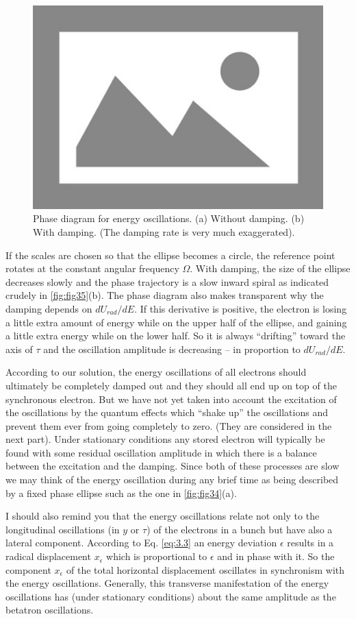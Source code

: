 \begin{figure}[!htb]
	\centering
	\includegraphics[width=0.6\linewidth]{./Figuras/placeholder.png}
	\caption{Phase diagram for energy oscillations. (a) Without damping. (b) With damping. (The damping rate is very much exaggerated).}
	\label{fig:fig35}
\end{figure}

If the scales are chosen so that the ellipse becomes a circle, the reference point rotates at the constant angular frequency $\Omega$. With damping, the size of the ellipse decreases slowly and the phase trajectory is a slow inward spiral as indicated crudely in \autoref{fig:fig35}(b). The phase diagram also makes transparent why the damping depends on $dU_{rad}/dE$. If this derivative is positive, the electron is losing a little extra amount of energy while on the upper half of the ellipse, and gaining a little extra energy while on the lower half. So it is always “drifting” toward the axis of $\tau$ and the oscillation amplitude is decreasing -- in proportion to $dU_{rad}/dE$.

According to our solution, the energy oscillations of all electrons should ultimately be completely damped out and they should all end up on top of the synchronous electron. But we have not yet taken into account the excitation of the oscillations by the quantum effects which “shake up” the oscillations and prevent them ever from going completely to zero. (They are considered in the next part). Under stationary conditions any stored electron will typically be found with some residual oscillation amplitude in which there is a balance between the excitation and the damping. Since both of these processes are slow we may think of the energy oscillation during any brief time as being described by a fixed phase ellipse such as the one in \autoref{fig:fig34}(a).

I should also remind you that the energy oscillations relate not only to the longitudinal oscillations (in $y$ or $\tau$) of the electrons in a bunch but have also a lateral component. According to Eq. \eqref{eq:3.3} an energy deviation $\epsilon$ results in a radical displacement $x_\epsilon$ which is proportional to $\epsilon$ and in phase with it. So the component $x_\epsilon$ of the total horizontal displacement oscillates in synchronism with the energy oscillations. Generally, this transverse manifestation of the energy oscillations has (under stationary conditions) about the same amplitude as the betatron oscillations.